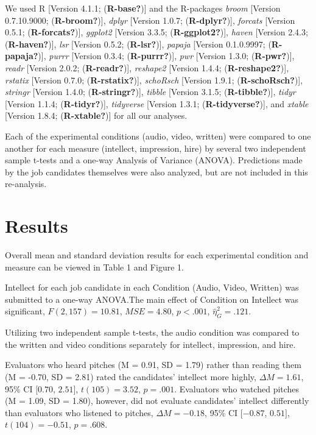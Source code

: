 \documentclass[
  english,
  man]{apa6}
\begin{document}
We used R {[}Version 4.1.1; (\textbf{R-base?}){]} and the R-packages \emph{broom} {[}Version 0.7.10.9000; (\textbf{R-broom?}){]}, \emph{dplyr} {[}Version 1.0.7; (\textbf{R-dplyr?}){]}, \emph{forcats} {[}Version 0.5.1; (\textbf{R-forcats?}){]}, \emph{ggplot2} {[}Version 3.3.5; (\textbf{R-ggplot2?}){]}, \emph{haven} {[}Version 2.4.3; (\textbf{R-haven?}){]}, \emph{lsr} {[}Version 0.5.2; (\textbf{R-lsr?}){]}, \emph{papaja} {[}Version 0.1.0.9997; (\textbf{R-papaja?}){]}, \emph{purrr} {[}Version 0.3.4; (\textbf{R-purrr?}){]}, \emph{pwr} {[}Version 1.3.0; (\textbf{R-pwr?}){]}, \emph{readr} {[}Version 2.0.2; (\textbf{R-readr?}){]}, \emph{reshape2} {[}Version 1.4.4; (\textbf{R-reshape2?}){]}, \emph{rstatix} {[}Version 0.7.0; (\textbf{R-rstatix?}){]}, \emph{schoRsch} {[}Version 1.9.1; (\textbf{R-schoRsch?}){]}, \emph{stringr} {[}Version 1.4.0; (\textbf{R-stringr?}){]}, \emph{tibble} {[}Version 3.1.5; (\textbf{R-tibble?}){]}, \emph{tidyr} {[}Version 1.1.4; (\textbf{R-tidyr?}){]}, \emph{tidyverse} {[}Version 1.3.1; (\textbf{R-tidyverse?}){]}, and \emph{xtable} {[}Version 1.8.4; (\textbf{R-xtable?}){]} for all our analyses.

Each of the experimental conditions (audio, video, written) were compared to one another for each measure (intellect, impression, hire) by several two independent sample t-tests and a one-way Analysis of Variance (ANOVA). Predictions made by the job candidates themselves were also analyzed, but are not included in this re-analysis.

\hypertarget{results}{%
\section{Results}\label{results}}

Overall mean and standard deviation results for each experimental condition and measure can be viewed in Table 1 and Figure 1.

Intellect for each job candidate in each Condition (Audio, Video, Written) was submitted to a one-way ANOVA.The main effect of Condition on Intellect was significant, \(F(2, 157) = 10.81\), \(\mathit{MSE} = 4.80\), \(p < .001\), \(\hat{\eta}^2_G = .121\).

Utilizing two independent sample t-tests, the audio condition was compared to the written and video conditions separately for intellect, impression, and hire.

Evaluators who heard pitches (M = 0.91, SD = 1.79) rather than reading them (M = -0.70, SD = 2.81) rated the candidates' intellect more highly, \(\Delta M = 1.61\), 95\% CI \([0.70\), \(2.51]\), \(t(105) = 3.52\), \(p = .001\). Evaluators who watched pitches (M = 1.09, SD = 1.80), however, did not evaluate candidates' intellect differently than evaluators who listened to pitches, \(\Delta M = -0.18\), 95\% CI \([-0.87\), \(0.51]\), \(t(104) = -0.51\), \(p = .608\).
\end{document}
